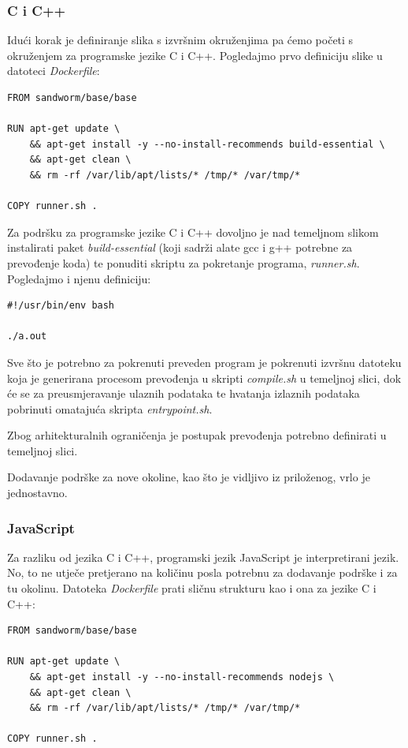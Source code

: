 \documentclass[times, utf8, zavrsni]{fer}
\begin{document}
\subsubsection{C i C++}

Idući korak je definiranje slika s izvršnim okruženjima pa ćemo početi s okruženjem za programske jezike C i C++. Pogledajmo prvo definiciju slike u datoteci {\textit{Dockerfile}}:

\begin{lstlisting}
FROM sandworm/base/base

RUN apt-get update \
    && apt-get install -y --no-install-recommends build-essential \
    && apt-get clean \
    && rm -rf /var/lib/apt/lists/* /tmp/* /var/tmp/*

COPY runner.sh .
\end{lstlisting}

Za podršku za programske jezike C i C++ dovoljno je nad temeljnom slikom instalirati paket {\textit{build-essential}} (koji sadrži alate gcc i g++ potrebne za prevođenje koda) te ponuditi skriptu za pokretanje programa, {\textit{runner.sh}}. Pogledajmo i njenu definiciju:

\begin{lstlisting}
#!/usr/bin/env bash

./a.out
\end{lstlisting}

Sve što je potrebno za pokrenuti preveden program je pokrenuti izvršnu datoteku koja je generirana procesom prevođenja u skripti {\textit{compile.sh}} u temeljnoj slici, dok će se za preusmjeravanje ulaznih podataka te hvatanja izlaznih podataka pobrinuti omatajuća skripta {\textit{entrypoint.sh}}.

Zbog arhitekturalnih ograničenja je postupak prevođenja potrebno definirati u temeljnoj slici. 

Dodavanje podrške za nove okoline, kao što je vidljivo iz priloženog, vrlo je jednostavno.

\subsubsection{JavaScript}

Za razliku od jezika C i C++, programski jezik JavaScript je interpretirani jezik. No, to ne utječe pretjerano na količinu posla potrebnu za dodavanje podrške i za tu okolinu. Datoteka {\textit{Dockerfile}} prati sličnu strukturu kao i ona za jezike C i C++:

\begin{lstlisting}
FROM sandworm/base/base

RUN apt-get update \
    && apt-get install -y --no-install-recommends nodejs \
    && apt-get clean \
    && rm -rf /var/lib/apt/lists/* /tmp/* /var/tmp/*

COPY runner.sh .
\end{lstlisting}
\end{document}
